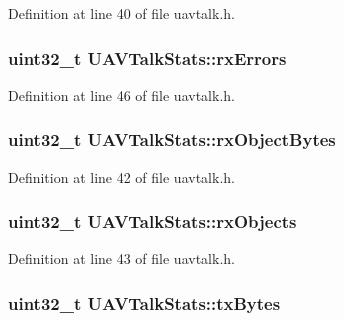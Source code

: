 \-Definition at line 40 of file uavtalk.\-h.

\hypertarget{struct_u_a_v_talk_stats_a0496877af8f1ce9110b2b42a58956e10}{
\subsubsection[{rx\-Errors}]{\setlength{\rightskip}{0pt plus 5cm}uint32\-\_\-t {\bf \-U\-A\-V\-Talk\-Stats\-::rx\-Errors}}}\label{struct_u_a_v_talk_stats_a0496877af8f1ce9110b2b42a58956e10}


\-Definition at line 46 of file uavtalk.\-h.

\hypertarget{struct_u_a_v_talk_stats_a5adb8d84e7dfe9f3aa1a03a6c057f2fd}{
\subsubsection[{rx\-Object\-Bytes}]{\setlength{\rightskip}{0pt plus 5cm}uint32\-\_\-t {\bf \-U\-A\-V\-Talk\-Stats\-::rx\-Object\-Bytes}}}\label{struct_u_a_v_talk_stats_a5adb8d84e7dfe9f3aa1a03a6c057f2fd}


\-Definition at line 42 of file uavtalk.\-h.

\hypertarget{struct_u_a_v_talk_stats_abe87f216fd1bb8fdb474a61d467d7b41}{
\subsubsection[{rx\-Objects}]{\setlength{\rightskip}{0pt plus 5cm}uint32\-\_\-t {\bf \-U\-A\-V\-Talk\-Stats\-::rx\-Objects}}}\label{struct_u_a_v_talk_stats_abe87f216fd1bb8fdb474a61d467d7b41}


\-Definition at line 43 of file uavtalk.\-h.

\hypertarget{struct_u_a_v_talk_stats_a7d5a1c5d207383ebd5b62b27b78ec264}{
\subsubsection[{tx\-Bytes}]{\setlength{\rightskip}{0pt plus 5cm}uint32\-\_\-t {\bf \-U\-A\-V\-Talk\-Stats\-::tx\-Bytes}}}\label{struct_u_a_v_talk_stats_a7d5a1c5d207383ebd5b62b27b78ec264}


